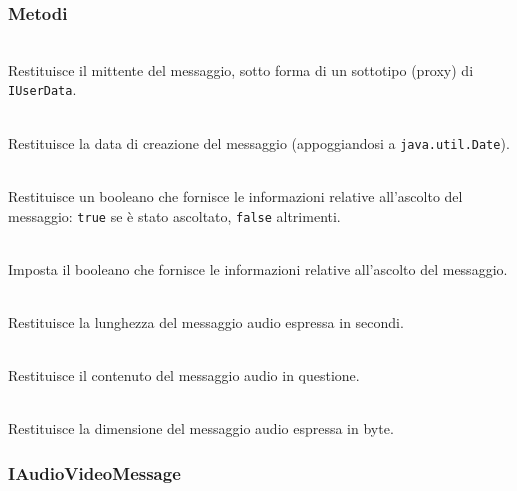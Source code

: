 \subsubsection*{Metodi}
\begin{description}
  \item{}\\
Restituisce il mittente del messaggio, sotto forma di un sottotipo (proxy) di \texttt{IUserData}.
  \item{}\\
Restituisce la data di creazione del messaggio (appoggiandosi a \texttt{java.util.Date}).
  \item{}\\
Restituisce un booleano che fornisce le informazioni relative all'ascolto del messaggio: \texttt{true} se è stato ascoltato, \texttt{false} altrimenti.
  \item{}\\
Imposta il booleano che fornisce le informazioni relative all'ascolto del messaggio.
  \item{}\\
Restituisce la lunghezza del messaggio audio espressa in secondi.
  \item{}\\
Restituisce il contenuto del messaggio audio in questione.
  \item{}\\
Restituisce la dimensione del messaggio audio espressa in byte.
\end{description}

\subsubsection{IAudioVideoMessage}\label{sec:iaudiovideomessage}
